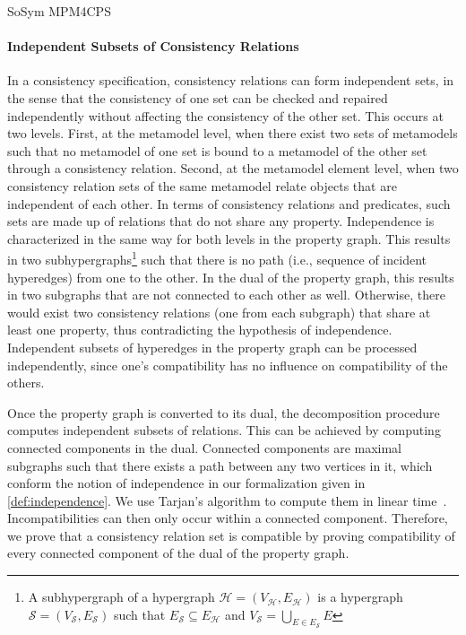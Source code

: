 \begin{copiedFrom}{SoSym MPM4CPS}
\paragraph{Independent Subsets of Consistency Relations}
In a consistency specification, consistency relations can form independent sets, in the sense that the consistency of one set can be checked and repaired independently without affecting the consistency of the other set. This occurs at two levels. 
First, at the metamodel level, when there exist two sets of metamodels such that no metamodel of one set is bound to a metamodel of the other set through a consistency relation. 
Second, at the metamodel element level, when two consistency relation sets of the same metamodel relate objects that are independent of each other. In terms of consistency relations and predicates, such sets are made up of relations that do not share any property.
Independence is characterized in the same way for both levels in the property graph. This results in two subhypergraphs\footnote{A subhypergraph of a hypergraph $\mathcal{H} = (V_{\mathcal{H}}, E_{\mathcal{H}})$ is a hypergraph $\mathcal{S} = (V_{\mathcal{S}}, E_{\mathcal{S}})$ such that $E_{\mathcal{S}} \subseteq E_{\mathcal{H}}$ and $V_{\mathcal{S}} = \bigcup_{E \in E_{\mathcal{S}}} E$} such that there is no path (i.e., sequence of incident hyperedges) from one to the other.
In the dual of the property graph, this results in two subgraphs that are not connected to each other as well. Otherwise, there would exist two consistency relations (one from each subgraph) that share at least one property, thus contradicting the hypothesis of independence. Independent subsets of hyperedges in the property graph can be processed independently, since one's compatibility has no influence on compatibility of the others.

Once the property graph is converted to its dual, the decomposition procedure computes independent subsets of relations. This can be achieved by computing connected components in the dual. Connected components are maximal subgraphs such that there exists a path between any two vertices in it, which conform the notion of independence in our formalization given in \autoref{def:independence}. We use Tarjan's algorithm to compute them in linear time~\cite{tarjan1972depth}. Incompatibilities can then only occur within a connected component. Therefore, we prove that a consistency relation set is compatible by proving compatibility of every connected component of the dual of the property graph.


\end{copiedFrom}
